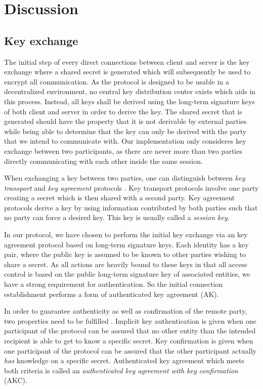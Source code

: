 \section{Discussion}

\subsection{Key exchange}

The initial step of every direct connections between client and server is the key exchange where a shared secret is generated which will subsequently be used to encrypt all communication.
As the protocol is designed to be usable in a decentralized environment, no central key distribution center exists which aids in this process.
Instead, all keys shall be derived using the long-term signature keys of both client and server in order to derive the key.
The shared secret that is generated should have the property that it is not derivable by external parties while being able to determine that the key can only be derived with the party that we intend to communicate with.
Our implementation only consideres key exchange between two participants, as there are never more than two parties directly communicating with each other inside the same session.

When exchanging a key between two parties, one can distinguish between \emph{key transport} and \emph{key agreement} protocols \cite{menezes1996handbook}.
Key transport protocols involve one party creating a secret which is then shared with a second party.
Key agreement protocols derive a key by using information contributed by both parties such that no party can force a desired key.
This key is usually called a \emph{session key}.

In our protocol, we have chosen to perform the initial key exchange via an key agreement protocol based on long-term signature keys.
Each identity has a key pair, where the public key is assumed to be known to other parties wishing to share a secret.
As all actions are heavily bound to these keys in that all access control is based on the public long-term signature key of associated entities, we have a strong requirement for authentication.
So the initial connection establishment performs a form of authenticated key agreement (AK).

In order to guarantee authenticity as well as confirmation of the remote party, two properties need to be fulfilled \cite{law2003efficient}.
Implicit key authentication is given when one participant of the protocol can be assured that no other entity than the intended recipient is able to get to know a specific secret.
Key confirmation is given when one participant of the protocol can be assured that the other participant actually \emph{has} knowledge on a specific secret.
Authenticated key agreement which meets both criteria is called an \emph{authenticated key agreement with key confirmation} (AKC).

